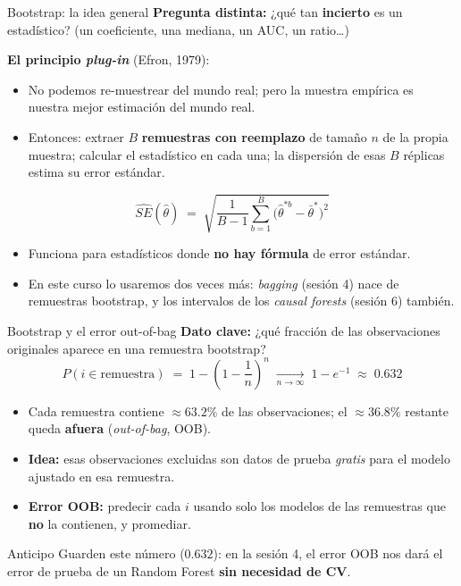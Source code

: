 \documentclass{beamer}
\newcommand{\1}{\mathbb{I}}
\begin{document}
\begin{frame}{Bootstrap: la idea general}
\small
\textbf{Pregunta distinta:} ¿qué tan \textbf{incierto} es un estadístico? (un coeficiente, una mediana, un AUC, un ratio\ldots)
\pause

\vspace{0.15cm}
\textbf{El principio \emph{plug-in}} (Efron, 1979):
\begin{itemize}\itemsep4pt
  \item No podemos re-muestrear del mundo real; pero la muestra empírica es nuestra mejor estimación del mundo real.
  \item Entonces: extraer $B$ \textbf{remuestras con reemplazo} de tamaño $n$ de la propia muestra; calcular el estadístico en cada una; la dispersión de esas $B$ réplicas estima su error estándar.
\end{itemize}
\[ \widehat{SE}(\hat{\theta}) \;=\; \sqrt{ \frac{1}{B-1} \sum_{b=1}^{B} \big( \hat{\theta}^{*b} - \bar{\theta}^{*} \big)^2 } \]
\pause

\begin{itemize}\itemsep3pt
  \item Funciona para estadísticos donde \textbf{no hay fórmula} de error estándar.
  \item En este curso lo usaremos dos veces más: \emph{bagging} (sesión 4) nace de remuestras bootstrap, y los intervalos de los \emph{causal forests} (sesión 6) también.
\end{itemize}
\end{frame}

\begin{frame}{Bootstrap y el error out-of-bag}
\small
\textbf{Dato clave:} ¿qué fracción de las observaciones originales aparece en una remuestra bootstrap?
\pause
\[ P(i \in \text{remuestra}) \;=\; 1 - \left(1 - \frac{1}{n}\right)^{n} \;\xrightarrow[n \to \infty]{}\; 1 - e^{-1} \;\approx\; 0.632 \]
\pause

\begin{itemize}\itemsep5pt
  \item Cada remuestra contiene $\approx 63.2\%$ de las observaciones; el $\approx 36.8\%$ restante queda \textbf{afuera} (\emph{out-of-bag}, OOB).
  \item \textbf{Idea:} esas observaciones excluidas son datos de prueba \emph{gratis} para el modelo ajustado en esa remuestra.
  \item \textbf{Error OOB:} predecir cada $i$ usando solo los modelos de las remuestras que \textbf{no} la contienen, y promediar.
\end{itemize}
\pause

\vspace{0.2cm}
\begin{block}{Anticipo}
Guarden este número ($0.632$): en la sesión 4, el error OOB nos dará el error de prueba de un Random Forest \textbf{sin necesidad de CV}.
\end{block}
\end{frame}
\end{document}
